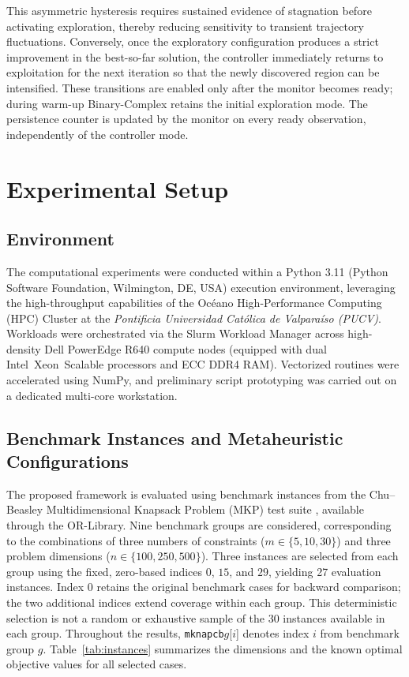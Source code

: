 \documentclass[journal,article,submit,moreauthors]{Definitions/mdpi}
\begin{document}
This asymmetric hysteresis requires sustained evidence of stagnation before
activating exploration, thereby reducing sensitivity to transient trajectory
fluctuations. Conversely, once the exploratory configuration produces a
strict improvement in the best-so-far solution, the controller immediately
returns to exploitation for the next iteration so that the newly
discovered region can be intensified. These transitions are enabled only
after the monitor becomes ready; during warm-up Binary-Complex retains
the initial exploration mode. The persistence counter is updated by the
monitor on every ready observation, independently of the controller mode.



\section{Experimental Setup}
\label{sec:experimental_setup}

\subsection{Environment}
\label{sec:computational_environment}

The computational experiments were conducted within a Python 3.11 (Python Software Foundation, Wilmington, DE, USA) execution environment, leveraging the high-throughput capabilities of the Océano High-Performance Computing (HPC) Cluster at the \textit{Pontificia Universidad Católica de Valparaíso (PUCV)}. Workloads were orchestrated via the Slurm Workload Manager across high-density Dell PowerEdge R640 compute nodes (equipped with dual Intel\textregistered\ Xeon\textregistered\ Scalable processors and ECC DDR4 RAM). Vectorized routines were accelerated using NumPy, and preliminary script prototyping was carried out on a dedicated multi-core workstation.

\subsection{Benchmark Instances and Metaheuristic Configurations}
\label{sec:instances}

The proposed framework is evaluated using benchmark instances from the
Chu--Beasley Multidimensional Knapsack Problem (MKP) test suite
\cite{chu1998genetic}, available through the OR-Library. Nine benchmark
groups are considered, corresponding to the combinations of three numbers
of constraints ($m\in\{5,10,30\}$) and three problem dimensions
($n\in\{100,250,500\}$). Three instances are selected from each group
using the fixed, zero-based indices $0$, $15$, and $29$, yielding 27
evaluation instances. Index $0$ retains the original benchmark cases for
backward comparison; the two additional indices extend coverage within
each group. This deterministic selection is not a random or exhaustive
sample of the 30 instances available in each group.
Throughout the results, \texttt{mknapcb}$g$[$i$] denotes index $i$ from
benchmark group $g$. Table~\ref{tab:instances} summarizes the dimensions
and the known optimal objective values for all selected cases.
\end{document}
